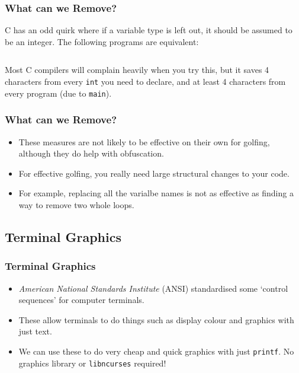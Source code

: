 \documentclass[handout,xcolor]{beamer}
\begin{document}
\begin{frame}
	\frametitle{What can we Remove?}
	\pause
	
	\small
	
	C has an odd quirk where if a variable type is left out, it should be assumed to be an integer. The following programs are equivalent:
	\pause
	
	\begin{columns}
		\begin{column}{0.45\textwidth}
			\centering
			
		\end{column}
		\pause
		
		\begin{column}{0.45\textwidth}
			\centering
			
		\end{column}
	\end{columns}

	Most C compilers will complain heavily when you try this, but it saves 4 characters from every \texttt{int} you need to declare, and at least 4 characters from every program (due to \texttt{main}).
\end{frame}

\begin{frame}
	\frametitle{What can we Remove?}
	\pause
	
	\begin{itemize}
		\item These measures are not likely to be effective on their own for golfing, although they do help with obfuscation.
		\pause
		
		\item For effective golfing, you really need large structural changes to your code.
		\pause
		
		\item For example, replacing all the varialbe names is not as effective as finding a way to remove two whole loops.
	\end{itemize}
\end{frame}

\subsection{Terminal Graphics}

\begin{frame}
	\frametitle{Terminal Graphics}
	\pause
	
	\begin{itemize}
		\item \textit{American National Standards Institute} (ANSI) standardised some `control sequences' for computer terminals.
		\pause
		
		\item These allow terminals to do things such as display colour and graphics with just text.
		\pause
		
		\item We can use these to do very cheap and quick graphics with just \texttt{printf}. No graphics library or \texttt{libncurses} required!
	\end{itemize}
\end{frame}
\end{document}
